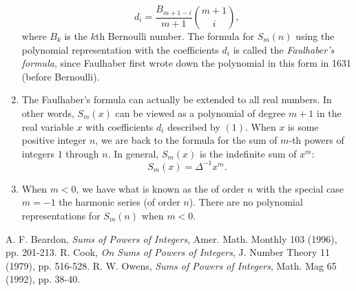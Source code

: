 \documentclass[12pt]{article}
\begin{document}
\begin{enumerate}
\begin{equation}d_i=\frac{B_{m+1-i}}{m+1}\binom{m+1}{i},\end{equation} where $B_k$ is the $k$th Bernoulli number.  The formula for $S_m(n)$ using the polynomial representation with the coefficients $d_i$ is called the \emph{Faulhaber's formula}, since Faulhaber first wrote down the polynomial in this form in 1631 (before Bernoulli).
\item
The Faulhaber's formula can actually be extended to all real numbers.  In other words, $S_m(x)$ can be viewed as a polynomial of degree $m+1$ in the real variable $x$ with coefficients $d_i$ described by $(1)$.  When $x$ is some positive integer $n$, we are back to the formula for the sum of $m$-th powers of integers $1$ through $n$.  In general, $S_m(x)$ is the indefinite sum of $x^m$: $$S_m(x)=\Delta^{-1} x^m.$$
\item
When $m<0$, we have what is known as the  of order $n$ with the special case $m=-1$ the harmonic series (of order $n$).  There are no polynomial representations for $S_m(n)$ when $m<0$.
\end{enumerate}


\begin{thebibliography}{9}
 A. F. Beardon, \emph{Sums of Powers of Integers}, Amer. Math. Monthly 103 (1996), pp. 201-213.
 R. Cook, \emph{On Sums of Powers of Integers}, J. Number Theory 11 (1979), pp. 516-528.
 R. W. Owens, \emph{Sums of Powers of Integers}, Math. Mag 65 (1992), pp. 38-40.
\end{thebibliography}
\end{document}
